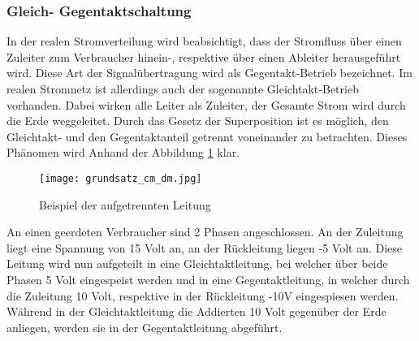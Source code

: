 \subsubsection{Gleich- Gegentaktschaltung} \label{subsubsec:gegentakt}

In der realen Stromverteilung wird beabsichtigt, dass der Stromfluss über einen Zuleiter zum Verbraucher hinein-, respektive über einen Ableiter herausgeführt wird. 
Diese Art der Signalübertragung wird als Gegentakt-Betrieb bezeichnet. Im realen Stromnetz ist allerdings auch der sogenannte Gleichtakt-Betrieb vorhanden. Dabei wirken alle Leiter als Zuleiter, der Gesamte Strom wird durch die Erde weggeleitet. Durch das Gesetz der Superposition ist es möglich, den Gleichtakt- und den Gegentaktanteil getrennt voneinander zu betrachten. Dieses Phänomen wird Anhand der Abbildung \ref{fig:auftrennen_der_leitung} klar. 

\begin{figure}[H]
	\centering
	\texttt{[image: grundsatz\_cm\_dm.jpg]}
	\caption{Beispiel der aufgetrennten Leitung}
	\label{fig:auftrennen_der_leitung}
\end{figure} 


An einen geerdeten Verbraucher sind 2 Phasen angeschlossen. An der Zuleitung liegt eine Spannung von 15 Volt an, an der Rückleitung liegen -5 Volt an. Diese Leitung wird nun aufgeteilt in eine Gleichtaktleitung, bei welcher über beide Phasen 5 Volt eingespeist werden und in eine Gegentaktleitung, in welcher durch die Zuleitung 10 Volt, respektive in der Rückleitung -10V eingespiesen werden. Während in der Gleichtaktleitung die Addierten 10 Volt gegenüber der Erde anliegen, werden sie in der Gegentaktleitung abgeführt.

\newpage




